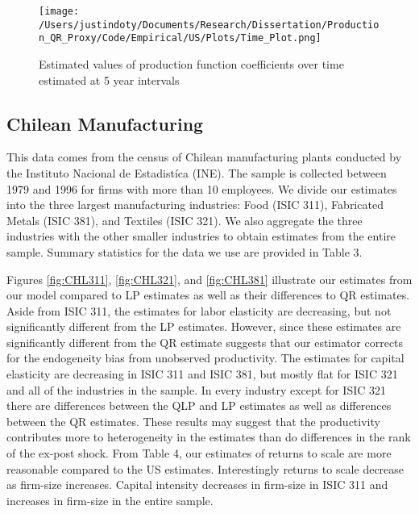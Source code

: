 \documentclass[11pt]{article}
\begin{document}
\begin{figure}[H]
\centering
\texttt{[image: /Users/justindoty/Documents/Research/Dissertation/Production\_QR\_Proxy/Code/Empirical/US/Plots/Time\_Plot.png]}
\caption{Estimated values of production function coefficients over time estimated at 5 year intervals}
\label{fig:UStimecoef}
\end{figure}



\subsection{Chilean Manufacturing}
This data comes from the census of Chilean manufacturing plants conducted by the Instituto Nacional de Estadist\'ica (INE). The sample is collected between 1979 and 1996 for firms with more than 10 employees. We divide our estimates into the three largest manufacturing industries: Food (ISIC 311), Fabricated Metals (ISIC 381), and Textiles (ISIC 321). We also aggregate the three industries with the other smaller industries to obtain estimates from the entire sample. Summary statistics for the data we use are provided in Table 3.

Figures \ref{fig:CHL311}, \ref{fig:CHL321}, and \ref{fig:CHL381} illustrate our estimates from our model compared to LP estimates as well as their differences to QR estimates. Aside from ISIC 311, the estimates for labor elasticity are decreasing, but not significantly different from the LP estimates. However, since these estimates are significantly different from the QR estimate suggests that our estimator corrects for the endogeneity bias from unobserved productivity. The estimates for capital elasticity are decreasing in ISIC 311 and ISIC 381, but mostly flat for ISIC 321 and all of the industries in the sample. In every industry except for ISIC 321 there are differences between the QLP and LP estimates as well as differences between the QR estimates. These results may suggest that the productivity contributes more to heterogeneity in the estimates than do differences in the rank of the ex-post shock. From Table 4, our estimates of returns to scale are more reasonable compared to the US estimates. Interestingly returns to scale decrease as firm-size increases. Capital intensity decreases in firm-size in ISIC 311 and increases in firm-size in the entire sample.


  
\end{document}
